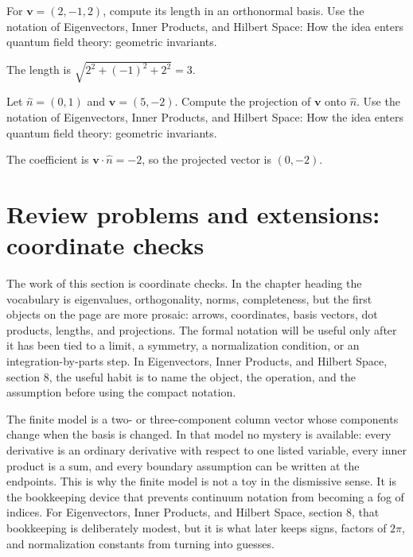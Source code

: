 \begin{exercise}
For \(\bm v=(2,-1,2)\), compute its length in an orthonormal basis.  Use the notation of Eigenvectors, Inner Products, and Hilbert Space: How the idea enters quantum field theory: geometric invariants.
\begin{answer}
The length is \(\sqrt{2^2+(-1)^2+2^2}=3\).
\end{answer}
\end{exercise}

\begin{exercise}
Let \(\hat n=(0,1)\) and \(\bm v=(5,-2)\).  Compute the projection of \(\bm v\) onto \(\hat n\).  Use the notation of Eigenvectors, Inner Products, and Hilbert Space: How the idea enters quantum field theory: geometric invariants.
\begin{answer}
The coefficient is \(\bm v\cdot\hat n=-2\), so the projected vector is \((0,-2)\).
\end{answer}
\end{exercise}



\section{Review problems and extensions: coordinate checks}

The work of this section is coordinate checks.  In the chapter heading the vocabulary is eigenvalues, orthogonality, norms, completeness, but the first objects on the page are more prosaic: arrows, coordinates, basis vectors, dot products, lengths, and projections.  The formal notation will be useful only after it has been tied to a limit, a symmetry, a normalization condition, or an integration-by-parts step.  In Eigenvectors, Inner Products, and Hilbert Space, section 8, the useful habit is to name the object, the operation, and the assumption before using the compact notation.

The finite model is a two- or three-component column vector whose components change when the basis is changed.  In that model no mystery is available: every derivative is an ordinary derivative with respect to one listed variable, every inner product is a sum, and every boundary assumption can be written at the endpoints.  This is why the finite model is not a toy in the dismissive sense.  It is the bookkeeping device that prevents continuum notation from becoming a fog of indices.  For Eigenvectors, Inner Products, and Hilbert Space, section 8, that bookkeeping is deliberately modest, but it is what later keeps signs, factors of \(2\pi\), and normalization constants from turning into guesses.

